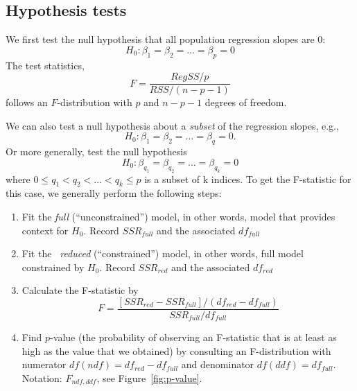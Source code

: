 \subsection*{Hypothesis tests}
We first test the null hypothesis that all population regression slopes are $0$:
$$
H_0:\beta_1 = \beta_2 = \dots = \beta_p = 0
$$
%
The test statistics,
%
$$
F = \frac{RegSS/p}{RSS/(n-p-1)}
$$
%
follows an $F$-distribution with $p$ and $n - p -1$ degrees of freedom.

We can also test a null hypothesis about a {\it subset} of the regression slopes, e.g., 
$$
H_0: \beta_1 = \beta_2 = \dots = \beta_q = 0.
$$
Or more generally, test the null hypothesis
$$
H_0: \beta_{q_1} = \beta_{q_2} = \dots = \beta_{q_k} = 0
$$
where $0 \le q_1 < q_2 < \dots < q_k \le p$ is a subset of k indices.
To get the F-statistic for this case, we generally perform the following steps:
\begin{enumerate}
  \item Fit the {\it full} (``unconstrained'') model, in other words, model that provides context for $H_0$.  Record $SSR_{full}$ and the associated $df_{full}$
  \item Fit the {\it  reduced} (``constrained'') model, in other words, full model constrained by $H_0$.  Record $SSR_{red}$ and the associated $df_{red}$
  \item Calculate the F-statistic by 
  $$
  F = \frac{[SSR_{red} - SSR_{full}]/(df_{red} - df_{full})}{SSR_{full}/df_{full}}
  $$
  \item Find $p$-value (the probability of observing an F-statistic that is at least as high as the value that we obtained) by consulting an F-distribution with numerator $df (ndf) = df_{red} - df_{full}$ and denominator $df (ddf)= df_{full}$.
  Notation: $F_{ndf, ddf}$, see Figure~\ref{fig:p-value}.
\end{enumerate}

